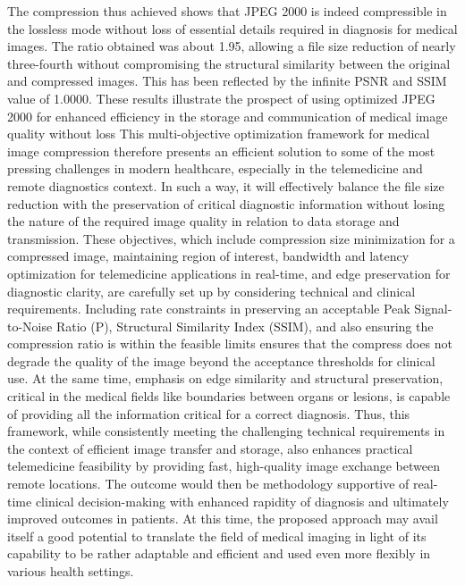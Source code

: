 \documentclass[conference,letterpaper]{IEEEtran}
\begin{document}
The compression thus achieved shows that JPEG 2000 is indeed compressible in the lossless mode without loss of essential details required in diagnosis for medical images. The ratio obtained was about 1.95, allowing a file size reduction of nearly three-fourth without compromising the structural similarity between the original and compressed images. This has been reflected by the infinite PSNR and SSIM value of 1.0000. These results illustrate the prospect of using optimized JPEG 2000 for enhanced efficiency in the storage and communication of medical image quality without loss 
This multi-objective optimization framework for medical image compression therefore presents an efficient solution to some of the most pressing challenges in modern healthcare, especially in the telemedicine and remote diagnostics context. In such a way, it will effectively balance the file size reduction with the preservation of critical diagnostic information without losing the nature of the required image quality in relation to data storage and transmission. These objectives, which include compression size minimization for a compressed image, maintaining region of interest, bandwidth and latency optimization for telemedicine applications in real-time, and edge preservation for diagnostic clarity, are carefully set up by considering technical and clinical requirements. Including rate constraints in preserving an acceptable Peak Signal-to-Noise Ratio (P), Structural Similarity Index (SSIM), and also ensuring the compression ratio is within the feasible limits ensures that the compress does not degrade the quality of the image beyond the acceptance thresholds for clinical use. At the same time, emphasis on edge similarity and structural preservation, critical in the medical fields like boundaries between organs or lesions, is capable of providing all the information critical for a correct diagnosis. Thus, this framework, while consistently meeting the challenging technical requirements in the context of efficient image transfer and storage, also enhances practical telemedicine feasibility by providing fast, high-quality image exchange between remote locations. The outcome would then be methodology supportive of real-time clinical decision-making with enhanced rapidity of diagnosis and ultimately improved outcomes in patients. At this time, the proposed approach may avail itself a good potential to translate  the field of medical imaging in light of its capability to be rather adaptable and efficient and used even more flexibly in various health settings.
\end{document}
